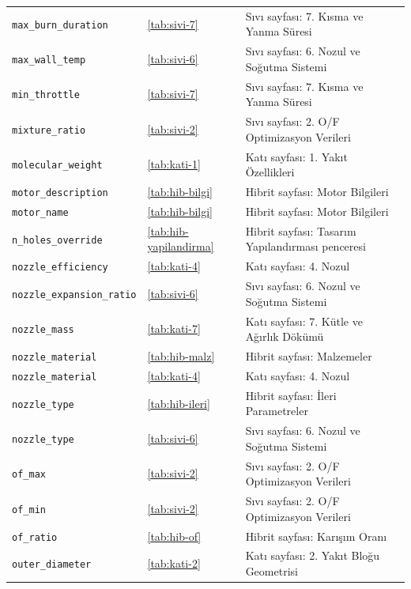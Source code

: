 \documentclass[11pt,a4paper]{article}
\begin{document}
{\begin{longtable}{@{}>{\raggedright\arraybackslash}p{5.2cm}p{1.4cm}>{\raggedright\arraybackslash}p{7.4cm}@{}}
\texttt{max\_\allowbreak{}burn\_\allowbreak{}duration} & \ref{tab:sivi-7} & Sıvı sayfası: 7. Kısma ve Yanma Süresi \\
\texttt{max\_\allowbreak{}wall\_\allowbreak{}temp} & \ref{tab:sivi-6} & Sıvı sayfası: 6. Nozul ve Soğutma Sistemi \\
\texttt{min\_\allowbreak{}throttle} & \ref{tab:sivi-7} & Sıvı sayfası: 7. Kısma ve Yanma Süresi \\
\texttt{mixture\_\allowbreak{}ratio} & \ref{tab:sivi-2} & Sıvı sayfası: 2. O/F Optimizasyon Verileri \\
\texttt{molecular\_\allowbreak{}weight} & \ref{tab:kati-1} & Katı sayfası: 1. Yakıt Özellikleri \\
\texttt{motor\_\allowbreak{}description} & \ref{tab:hib-bilgi} & Hibrit sayfası: Motor Bilgileri \\
\texttt{motor\_\allowbreak{}name} & \ref{tab:hib-bilgi} & Hibrit sayfası: Motor Bilgileri \\
\texttt{n\_\allowbreak{}holes\_\allowbreak{}override} & \ref{tab:hib-yapilandirma} & Hibrit sayfası: Tasarım Yapılandırması penceresi \\
\texttt{nozzle\_\allowbreak{}efficiency} & \ref{tab:kati-4} & Katı sayfası: 4. Nozul \\
\texttt{nozzle\_\allowbreak{}expansion\_\allowbreak{}ratio} & \ref{tab:sivi-6} & Sıvı sayfası: 6. Nozul ve Soğutma Sistemi \\
\texttt{nozzle\_\allowbreak{}mass} & \ref{tab:kati-7} & Katı sayfası: 7. Kütle ve Ağırlık Dökümü \\
\texttt{nozzle\_\allowbreak{}material} & \ref{tab:hib-malz} & Hibrit sayfası: Malzemeler \\
\texttt{nozzle\_\allowbreak{}material} & \ref{tab:kati-4} & Katı sayfası: 4. Nozul \\
\texttt{nozzle\_\allowbreak{}type} & \ref{tab:hib-ileri} & Hibrit sayfası: İleri Parametreler \\
\texttt{nozzle\_\allowbreak{}type} & \ref{tab:sivi-6} & Sıvı sayfası: 6. Nozul ve Soğutma Sistemi \\
\texttt{of\_\allowbreak{}max} & \ref{tab:sivi-2} & Sıvı sayfası: 2. O/F Optimizasyon Verileri \\
\texttt{of\_\allowbreak{}min} & \ref{tab:sivi-2} & Sıvı sayfası: 2. O/F Optimizasyon Verileri \\
\texttt{of\_\allowbreak{}ratio} & \ref{tab:hib-of} & Hibrit sayfası: Karışım Oranı \\
\texttt{outer\_\allowbreak{}diameter} & \ref{tab:kati-2} & Katı sayfası: 2. Yakıt Bloğu Geometrisi \\

\end{longtable}}
\end{document}
